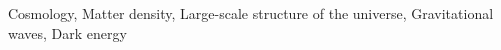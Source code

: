 \documentclass[twocolumn]{aastex631}
\begin{document}
Cosmology, Matter density, Large-scale structure of the universe, Gravitational waves, Dark energy
\end{document}
